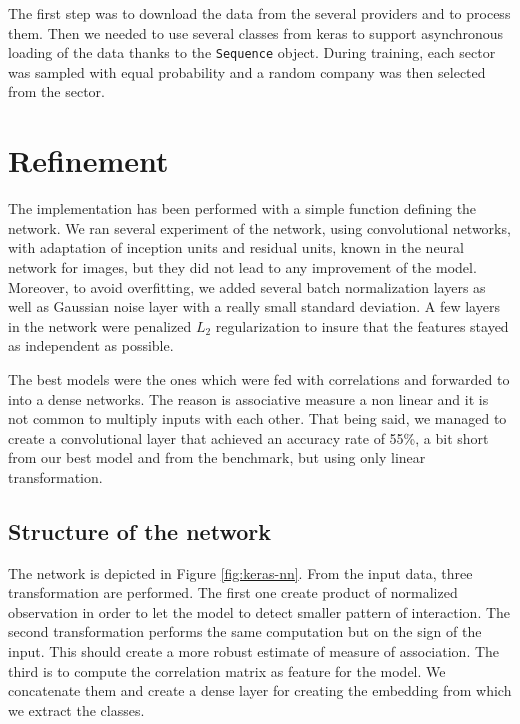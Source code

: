 \documentclass[a4paper,twoside]{article}
\begin{document}
The first step was to download the data from the several providers and to
process them. Then we needed to use several classes from keras to support
asynchronous loading of the data thanks to the \texttt{Sequence} object. During
training, each sector was sampled with equal probability and a random
company was then selected from the sector.

\section{Refinement}
\label{sec:org4d037f0}

The implementation has been performed with a simple function defining the
network. We ran several experiment of the network, using convolutional
networks, with adaptation of inception units and residual units, known in the
neural network for images, but they did not lead to any improvement of the
model. Moreover, to avoid overfitting, we added several batch normalization
layers as well as Gaussian noise layer with a really small standard deviation.
A few layers in the network were penalized \(L_2\) regularization to insure that
the features stayed as independent as possible.

The best models were the ones which were fed with correlations and forwarded
to into a dense networks. The reason is associative measure a non linear and
it is not common to multiply inputs with each other. That being said, we
managed to create a convolutional layer that achieved an accuracy rate of
55\%, a bit short from our best model and from the benchmark, but using only
linear transformation.


\subsection{Structure of the network}
\label{sec:orgf5864a6}

The network is depicted in Figure \ref{fig:keras-nn}. From the input data,
three transformation are performed. The first one create product of
normalized observation in order to let the model to detect smaller pattern of
interaction. The second transformation performs the same computation but on
the sign of the input. This should create a more robust estimate of measure
of association. The third is to compute the correlation matrix as feature for
the model. We concatenate them and create a dense layer for creating the
embedding from which we extract the classes.
\end{document}
